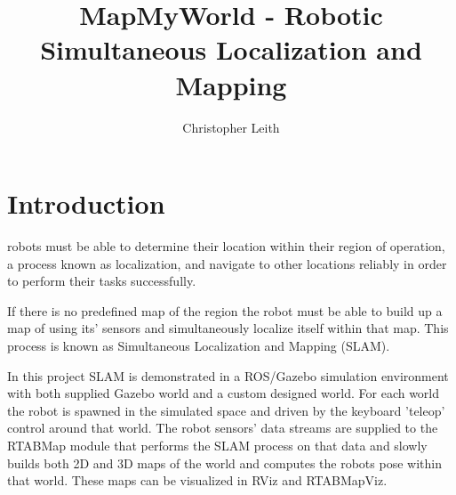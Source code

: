 \documentclass[10pt,journal,compsoc]{IEEEtran}
\begin{document}
\title{MapMyWorld - Robotic Simultaneous Localization and Mapping}

\author{Christopher Leith}

%
{}


\maketitle
\IEEEdisplaynontitleabstractindextext
\IEEEpeerreviewmaketitle
\label{sec:Introduction}
\section{Introduction}
 robots must be able to determine their location within their region of operation, a process known as localization, and navigate to other locations reliably in order to perform their tasks successfully.

If there is no predefined map of the region the robot must be able to build up a map of using its' sensors and simultaneously localize itself within that map. This process is known as Simultaneous Localization and Mapping (SLAM).

In this project SLAM is demonstrated in a ROS/Gazebo simulation environment with both supplied Gazebo world and a custom designed world. For each world the robot is spawned in the simulated space and driven by the keyboard 'teleop' control around that world. The robot sensors' data streams are supplied to the RTABMap module that performs the SLAM process on that data and slowly builds both 2D and 3D maps of the world and computes the robots pose within that world. These maps can be visualized in RViz and RTABMapViz.
\end{document}
